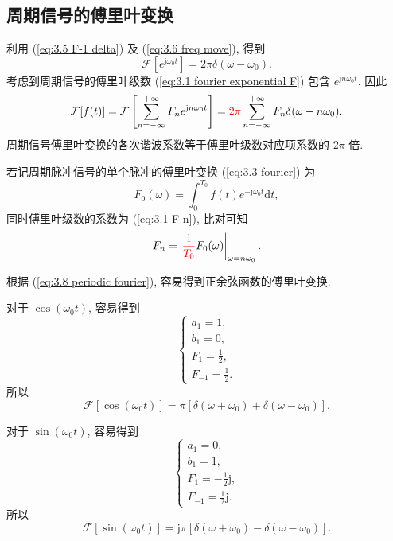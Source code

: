 \subsection{周期信号的傅里叶变换} \label{3 周期信号的傅里叶变换}
利用 (\ref{eq:3.5 F-1 delta}) 及 (\ref{eq:3.6 freq move}), 得到
\begin{equation}
    \mathcal{F}[e^{\mathrm{j}\omega_0 t}]=2\pi\delta(\omega-\omega_0).
\end{equation}
考虑到周期信号的傅里叶级数 (\ref{eq:3.1 fourier exponential F}) 包含 $e^{\mathrm{j}n\omega_0 t}$. 因此
\begin{equation} \label{eq:3.8 periodic fourier}
    \mathcal{F}[f(t)]=\mathcal{F}\left[\sum_{n=-\infty}^{+\infty}F_n e^{\mathrm{j}n\omega_0 t}\right]={\color{red} 2\pi}\sum_{n=-\infty}^{+\infty}F_n\delta(\omega-n\omega_0).
\end{equation}
周期信号傅里叶变换的各次谐波系数等于傅里叶级数对应项系数的 $2\pi$ 倍.

若记周期脉冲信号的单个脉冲的傅里叶变换 (\ref{eq:3.3 fourier}) 为
\begin{equation}
    F_0(\omega)=\int_{0}^{T_0}f(t)e^{-\mathrm{j}\omega_0 t}\mathrm{d}t,
\end{equation}
同时傅里叶级数的系数为 (\ref{eq:3.1 F n}), 比对可知
\begin{equation}
    F_n=\left.{\color{red} \frac{1}{T_0}}F_0(\omega)\right|_{\omega=n\omega_0}.
\end{equation}

根据 (\ref{eq:3.8 periodic fourier}), 容易得到正余弦函数的傅里叶变换.

对于 $\cos(\omega_0 t)$, 容易得到
\begin{equation*}
    \begin{cases}
        a_1=1,           \\
        b_1=0,           \\
        F_1=\frac{1}{2}, \\
        F_{-1}=\frac{1}{2}.
    \end{cases}
\end{equation*}
所以
\begin{equation}
    \mathcal{F}[\cos(\omega_0 t)]=\pi[\delta(\omega+\omega_0)+\delta(\omega-\omega_0)].
\end{equation}

对于 $\sin(\omega_0 t)$, 容易得到
\begin{equation*}
    \begin{cases}
        a_1=0,                      \\
        b_1=1,                      \\
        F_1=-\frac{1}{2}\mathrm{j}, \\
        F_{-1}=\frac{1}{2}\mathrm{j}.
    \end{cases}
\end{equation*}
所以
\begin{equation}
    \mathcal{F}[\sin(\omega_0 t)]=\mathrm{j}\pi[\delta(\omega+\omega_0)-\delta(\omega-\omega_0)].
\end{equation}
